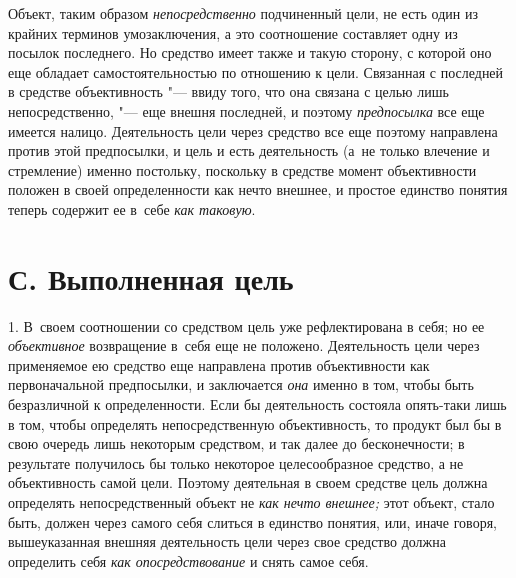 Объект, таким образом
{\em непосредственно}
подчиненный цели, не есть один из крайних терминов
умозаключения, а это соотношение составляет одну из посылок последнего. Но
средство имеет также и такую сторону, с которой оно еще обладает
самостоятельностью по отношению к цели. Связанная с последней в средстве
объективность "--- ввиду того, что она связана с целью лишь
непосредственно, "--- еще внешня последней, и поэтому
{\em предпосылка} все еще
имеется налицо. Деятельность цели через средство все еще поэтому направлена
против этой предпосылки, и цель и есть деятельность (а~не только влечение и
стремление) именно постольку, поскольку в средстве момент объективности
положен в своей определенности как нечто внешнее, и простое единство
понятия теперь содержит ее в~себе
{\em как таковую}.

\section[С. Выполненная цель]{С. Выполненная цель }
1. В~своем соотношении со средством цель уже рефлектирована в
себя; но ее {\em объективное}
возвращение в~себя еще не положено. Деятельность цели через
применяемое ею средство еще направлена против объективности как
первоначальной предпосылки, и заключается
{\em она} именно в том,
чтобы быть безразличной к определенности. Если бы деятельность состояла
опять-таки лишь в том, чтобы определять непосредственную объективность, то
продукт был бы в свою очередь лишь некоторым средством, и так далее до
бесконечности; в результате получилось бы только некоторое целесообразное
средство, а не объективность самой цели. Поэтому деятельная в своем
средстве цель должна определять непосредственный объект не
{\em как нечто внешнее;}
этот объект, стало быть, должен через самого себя слиться в
единство понятия, или, иначе говоря, вышеуказанная внешняя деятельность
цели через свое средство должна определить себя
{\em как опосредствование} и снять самое себя.

